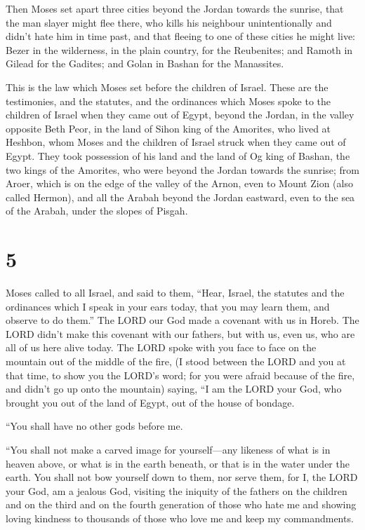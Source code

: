  Then Moses set apart three cities beyond the Jordan
towards the sunrise,  that the man slayer might flee there,
who kills his neighbour unintentionally and didn't hate him in time
past, and that fleeing to one of these cities he might live:
 Bezer in the wilderness, in the plain country, for the
Reubenites; and Ramoth in Gilead for the Gadites; and Golan in Bashan
for the Manassites.

 This is the law which Moses set before the children of
Israel.  These are the testimonies, and the statutes, and
the ordinances which Moses spoke to the children of Israel when they
came out of Egypt,  beyond the Jordan, in the valley
opposite Beth Peor, in the land of Sihon king of the Amorites, who lived
at Heshbon, whom Moses and the children of Israel struck when they came
out of Egypt.  They took possession of his land and the
land of Og king of Bashan, the two kings of the Amorites, who were
beyond the Jordan towards the sunrise;  from Aroer, which
is on the edge of the valley of the Arnon, even to Mount Zion (also
called Hermon),  and all the Arabah beyond the Jordan
eastward, even to the sea of the Arabah, under the slopes of Pisgah.

\hypertarget{section-4}{%
\section{5}\label{section-4}}

 Moses called to all Israel, and said to them, ``Hear,
Israel, the statutes and the ordinances which I speak in your ears
today, that you may learn them, and observe to do them.'' 
The LORD our God made a covenant with us in Horeb.  The LORD
didn't make this covenant with our fathers, but with us, even us, who
are all of us here alive today.  The LORD spoke with you
face to face on the mountain out of the middle of the fire, 
(I stood between the LORD and you at that time, to show you the LORD's
word; for you were afraid because of the fire, and didn't go up onto the
mountain) saying,  ``I am the LORD your God, who brought you
out of the land of Egypt, out of the house of bondage.

 ``You shall have no other gods before me.

 ``You shall not make a carved image for yourself---any
likeness of what is in heaven above, or what is in the earth beneath, or
that is in the water under the earth.  You shall not bow
yourself down to them, nor serve them, for I, the LORD your God, am a
jealous God, visiting the iniquity of the fathers on the children and on
the third and on the fourth generation of those who hate me
 and showing loving kindness to thousands of those who love
me and keep my commandments.

